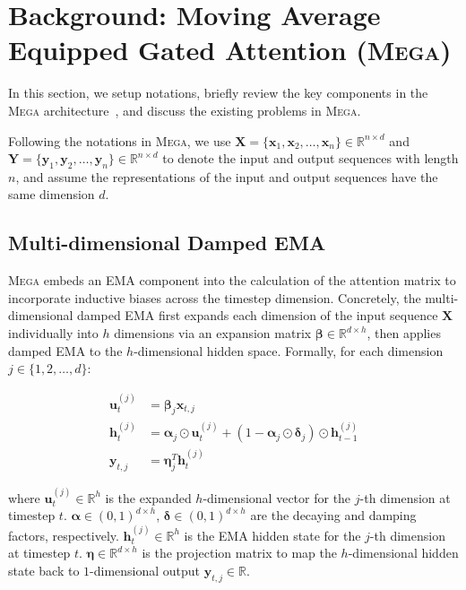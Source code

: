 \section{Background: Moving Average Equipped Gated Attention (\textsc{Mega})}
\label{sec:background}
In this section, we setup notations, briefly review the key components in the \textsc{Mega} architecture~\citep{ma2023mega}, and discuss the existing problems in \textsc{Mega}.

Following the notations in \textsc{Mega}, we use $\boldsymbol{X} = \{\mathbf{x}_1, \mathbf{x}_2, \ldots, \mathbf{x}_n\} \in \mathbb{R}^{n\times d}$ and $\boldsymbol{Y} =\{\mathbf{y}_1, \mathbf{y}_2, \ldots, \mathbf{y}_n\} \in \mathbb{R}^{n\times d}$ to denote the input and output sequences with length $n$, and assume the representations of the input and output sequences have the same dimension $d$. 

\subsection{Multi-dimensional Damped EMA}
\textsc{Mega} embeds an EMA component into the calculation of the attention matrix to incorporate inductive biases across the timestep dimension. Concretely, the multi-dimensional damped EMA first expands each dimension of the input sequence $\boldsymbol{X}$ individually into $h$ dimensions via an expansion matrix $\boldsymbol{\beta} \in \mathbb{R}^{d\times h}$, then applies damped EMA to the $h$-dimensional hidden space. Formally, for each dimension $j \in \{1, 2, \ldots, d\}$:

\begin{align}
\mathbf{u}^{(j)}_t & = \boldsymbol{\beta}_j \mathbf{x}_{t,j} \nonumber \\
\mathbf{h}^{(j)}_t & = \boldsymbol{\alpha}_j \odot \mathbf{u}^{(j)}_t + (1 - \boldsymbol{\alpha}_j \odot \boldsymbol{\delta}_j) \odot \mathbf{h}^{(j)}_{t-1} \label{eq:mddema} \\
\mathbf{y}_{t,j} & = \boldsymbol{\eta}^T_j \mathbf{h}^{(j)}_t \nonumber
\end{align}

where $\mathbf{u}^{(j)}_t \in \mathbb{R}^{h}$ is the expanded $h$-dimensional vector for the $j$-th dimension at timestep $t$. 
$\boldsymbol{\alpha} \in (0, 1)^{d\times h}$, $\boldsymbol{\delta} \in (0, 1)^{d\times h}$ are the decaying and damping factors, respectively. $\mathbf{h}^{(j)}_t \in \mathbb{R}^{h}$ is the EMA hidden state for the $j$-th dimension at timestep $t$. 
$\boldsymbol{\eta} \in \mathbb{R}^{d\times h}$ is the projection matrix to map the $h$-dimensional hidden state back to $1$-dimensional output $\mathbf{y}_{t,j} \in \mathbb{R} $.

